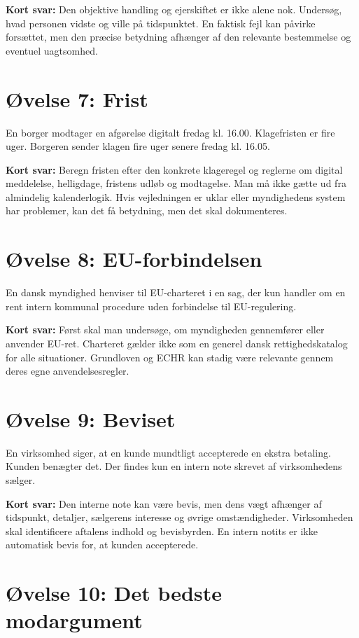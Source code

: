 \textbf{Kort svar:} Den objektive handling og ejerskiftet er ikke alene nok. Undersøg, hvad personen vidste og ville på tidspunktet. En faktisk fejl kan påvirke forsættet, men den præcise betydning afhænger af den relevante bestemmelse og eventuel uagtsomhed.

\section{Øvelse 7: Frist}

En borger modtager en afgørelse digitalt fredag kl. 16.00. Klagefristen er fire uger. Borgeren sender klagen fire uger senere fredag kl. 16.05.

\textbf{Kort svar:} Beregn fristen efter den konkrete klageregel og reglerne om digital meddelelse, helligdage, fristens udløb og modtagelse. Man må ikke gætte ud fra almindelig kalenderlogik. Hvis vejledningen er uklar eller myndighedens system har problemer, kan det få betydning, men det skal dokumenteres.

\section{Øvelse 8: EU-forbindelsen}

En dansk myndighed henviser til EU-charteret i en sag, der kun handler om en rent intern kommunal procedure uden forbindelse til EU-regulering.

\textbf{Kort svar:} Først skal man undersøge, om myndigheden gennemfører eller anvender EU-ret. Charteret gælder ikke som en generel dansk rettighedskatalog for alle situationer. Grundloven og ECHR kan stadig være relevante gennem deres egne anvendelsesregler.

\section{Øvelse 9: Beviset}

En virksomhed siger, at en kunde mundtligt accepterede en ekstra betaling. Kunden benægter det. Der findes kun en intern note skrevet af virksomhedens sælger.

\textbf{Kort svar:} Den interne note kan være bevis, men dens vægt afhænger af tidspunkt, detaljer, sælgerens interesse og øvrige omstændigheder. Virksomheden skal identificere aftalens indhold og bevisbyrden. En intern notits er ikke automatisk bevis for, at kunden accepterede.

\section{Øvelse 10: Det bedste modargument}

